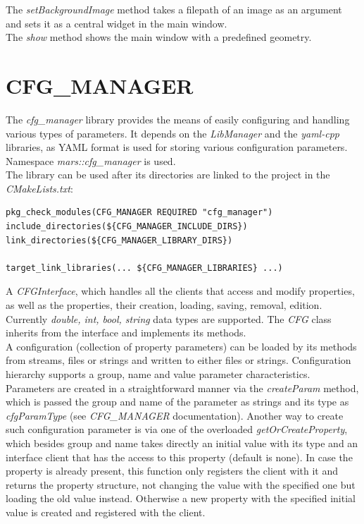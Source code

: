 \documentclass{article}
\begin{document}
The \emph{setBackgroundImage} method takes a filepath of an image as an argument and sets it as a central widget in the main window. \\

The \emph{show} method shows the main window with a predefined geometry.\\




\section{CFG\_MANAGER}

The \emph{cfg\_manager} library provides the means of easily configuring and handling various types of parameters. It depends on the \emph{LibManager} and the \emph{yaml-cpp} libraries, as YAML format is used for storing various configuration parameters. Namespace \emph{mars::cfg\_manager} is used.\\

The library can be used after its directories are linked to the project in the \emph{CMakeLists.txt}:

\begin{lstlisting}
pkg_check_modules(CFG_MANAGER REQUIRED "cfg_manager")
include_directories(${CFG_MANAGER_INCLUDE_DIRS})
link_directories(${CFG_MANAGER_LIBRARY_DIRS})

target_link_libraries(... ${CFG_MANAGER_LIBRARIES} ...)
\end{lstlisting}

A \emph{CFGInterface}, which handles all the clients that access and modify properties, as well as the properties, their creation, loading, saving, removal, edition. Currently \emph{double, int, bool, string} data types are supported. The \emph{CFG} class inherits from the interface and implements its methods.\\

A configuration (collection of property parameters) can be loaded by its methods from streams, files or strings and written to either files or strings. Configuration hierarchy supports a group, name and value parameter characteristics.\\

Parameters are created in a straightforward manner via the \emph{createParam} method, which is passed the group and name of the parameter as strings and its type as \emph{cfgParamType} (see \emph{CFG\_MANAGER} documentation). Another way to create such configuration parameter is via one of the overloaded \emph{getOrCreateProperty}, which besides group and name takes directly an initial value with its type and an interface client that has the access to this property (default is none). In case the property is already present, this function only registers the client with it and returns the property structure, not changing the value with the specified one but loading the old value instead. Otherwise a new property with the specified initial value is created and registered with the client.\\
\end{document}
